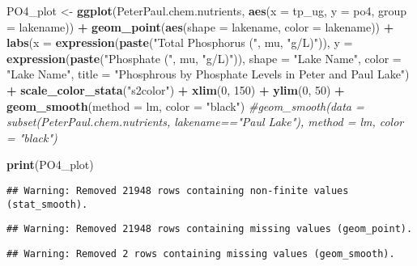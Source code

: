 \documentclass[]{article}
\newenvironment{Shaded}{\begin{snugshade}}{\end{snugshade}}
\newcommand{\CommentTok}[1]{\textcolor[rgb]{0.56,0.35,0.01}{\textit{#1}}}
\newcommand{\DataTypeTok}[1]{\textcolor[rgb]{0.13,0.29,0.53}{#1}}
\newcommand{\DecValTok}[1]{\textcolor[rgb]{0.00,0.00,0.81}{#1}}
\newcommand{\KeywordTok}[1]{\textcolor[rgb]{0.13,0.29,0.53}{\textbf{#1}}}
\newcommand{\NormalTok}[1]{#1}
\newcommand{\OperatorTok}[1]{\textcolor[rgb]{0.81,0.36,0.00}{\textbf{#1}}}
\newcommand{\StringTok}[1]{\textcolor[rgb]{0.31,0.60,0.02}{#1}}
\begin{document}
\begin{Shaded}
\begin{Highlighting}[]
\NormalTok{PO4_plot <-}\StringTok{ }\KeywordTok{ggplot}\NormalTok{(PeterPaul.chem.nutrients, }\KeywordTok{aes}\NormalTok{(}\DataTypeTok{x =}\NormalTok{ tp_ug, }\DataTypeTok{y =}\NormalTok{ po4, }\DataTypeTok{group =}\NormalTok{ lakename)) }\OperatorTok{+}
\StringTok{  }\KeywordTok{geom_point}\NormalTok{(}\KeywordTok{aes}\NormalTok{(}\DataTypeTok{shape =}\NormalTok{ lakename, }\DataTypeTok{color =}\NormalTok{ lakename)) }\OperatorTok{+}
\StringTok{  }\KeywordTok{labs}\NormalTok{(}\DataTypeTok{x =} \KeywordTok{expression}\NormalTok{(}\KeywordTok{paste}\NormalTok{(}\StringTok{"Total Phosphorus ("}\NormalTok{, mu, }\StringTok{"g/L)"}\NormalTok{)), }\DataTypeTok{y =} \KeywordTok{expression}\NormalTok{(}\KeywordTok{paste}\NormalTok{(}\StringTok{"Phosphate ("}\NormalTok{, mu, }\StringTok{"g/L)"}\NormalTok{)), }\DataTypeTok{shape =} \StringTok{"Lake Name"}\NormalTok{, }\DataTypeTok{color =} \StringTok{"Lake Name"}\NormalTok{, }\DataTypeTok{title =} \StringTok{"Phosphrous by Phosphate Levels in Peter and Paul Lake"}\NormalTok{) }\OperatorTok{+}
\StringTok{  }\KeywordTok{scale_color_stata}\NormalTok{(}\StringTok{"s2color"}\NormalTok{) }\OperatorTok{+}
\StringTok{  }\KeywordTok{xlim}\NormalTok{(}\DecValTok{0}\NormalTok{, }\DecValTok{150}\NormalTok{) }\OperatorTok{+}
\StringTok{  }\KeywordTok{ylim}\NormalTok{(}\DecValTok{0}\NormalTok{, }\DecValTok{50}\NormalTok{) }\OperatorTok{+}
\StringTok{  }\KeywordTok{geom_smooth}\NormalTok{(}\DataTypeTok{method =}\NormalTok{ lm, }\DataTypeTok{color =} \StringTok{"black"}\NormalTok{) }
  \CommentTok{#geom_smooth(data = subset(PeterPaul.chem.nutrients, lakename=="Paul Lake"), method = lm, color = "black")}
  
\KeywordTok{print}\NormalTok{(PO4_plot)}
\end{Highlighting}
\end{Shaded}

\begin{verbatim}
## Warning: Removed 21948 rows containing non-finite values (stat_smooth).
\end{verbatim}

\begin{verbatim}
## Warning: Removed 21948 rows containing missing values (geom_point).
\end{verbatim}

\begin{verbatim}
## Warning: Removed 2 rows containing missing values (geom_smooth).
\end{verbatim}
\end{document}
